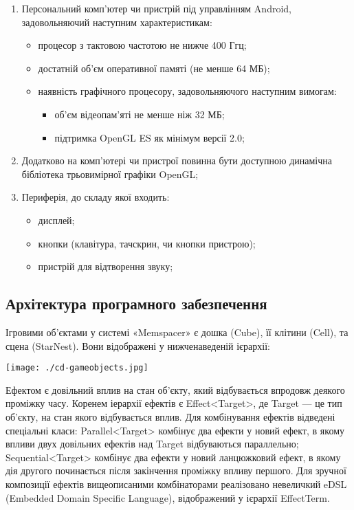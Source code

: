 \begin{enumerate}
  \item Персональний комп'ютер чи пристрій під управлінням Android, задовольняючий наступним характеристикам:
  \begin{itemize}
    \item процесор з тактовою частотою не нижче 400 Ггц;
    \item достатній об'єм оперативної памяті (не менше 64 МБ);
    \item наявність графічного процесору, задовольняючого наступним вимогам:
    \begin{itemize}
      \item об'єм відеопам'яті не менше ніж 32 МБ;
      \item підтримка OpenGL ES як мінімум версії 2.0;
    \end{itemize}
  \end{itemize}
  \item Додатково на комп'ютері чи пристрої повинна бути доступною динамічна бібліотека трьовимірної графіки OpenGL;
  \item Периферія, до складу якої входить:
  \begin{itemize}
    \item дисплей;
    \item кнопки (клавітура, тачскрин, чи кнопки пристрою);
    \item пристрій для відтворення звуку;
  \end{itemize}
\end{enumerate}

\subsection{Архітектура програмного забезпечення}

Ігровими об'єктами у системі «Memspacer» є дошка (Cube), її клітини (Cell), та сцена (StarNest). Вони відображені у нижченаведеній ієрархії:

\begin{center}
  \texttt{[image: ./cd-gameobjects.jpg]}
\end{center}

Ефектом є довільний вплив на стан об'єкту, який відбувається впродовж деякого проміжку часу. Коренем іерархії ефектів є Effect<Target>, де Target — це тип об'єкту, на стан якого відбувається вплив.
Для комбінування ефектів відведені спеціальні класи:
Parallel<Target> комбінує два ефекти у новий ефект, в якому впливи двух довільних ефектів над Target відбуваються параллельно;
Sequential<Target> комбінує два ефекти у новий ланцюжковий ефект, в якому дія другого починається після закінчення проміжку впливу першого.
	Для зручної композиції ефектів вищеописаними комбінаторами реалізовано невеличкий eDSL (Embedded Domain Specific Language), відображений у ієрархії EffectTerm.

